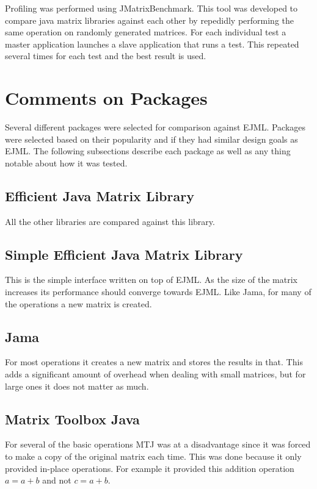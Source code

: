 \documentclass[12pt]{article}%
\begin{document}
Profiling was performed using JMatrixBenchmark.  This tool was developed to compare java matrix libraries against each other by repedidly performing the same operation on randomly generated matrices.  For each individual test a master application launches a slave application that runs a test.  This repeated several times for each test and the best result is used.  

\section{Comments on Packages}

Several different packages were selected for comparison against EJML.  Packages were selected based on their popularity and if they had similar design goals as EJML.  The following subsections describe each package as well as any thing notable about how it was tested.

\subsection{Efficient Java Matrix Library}

All the other libraries are compared against this library.

\subsection{Simple Efficient Java Matrix Library}

This is the simple interface written on top of EJML.  As the size of the matrix increases its performance should converge towards EJML.  Like Jama, for many of the operations a new matrix is created.

\subsection{Jama}
For most operations it creates a new matrix and stores the results in that.  This adds a significant amount of overhead when dealing with small matrices, but for large ones it does not matter as much.

\subsection{Matrix Toolbox Java}

For several of the basic operations MTJ was at a disadvantage since it was forced to make a copy of the original matrix each time.  This was done because it only provided in-place operations.  For example it provided this addition operation $a=a+b$ and not $c=a+b$.
\end{document}
